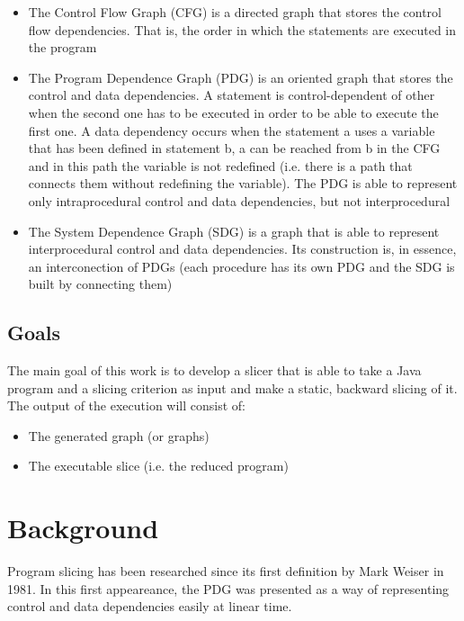 \documentclass[a4paper]{article}
\begin{document}
\begin{itemize}
\item The Control Flow Graph (CFG) is a directed graph that stores the control flow dependencies. That is, the order in which the statements are executed in the program
\item The Program Dependence Graph (PDG) is an oriented graph that stores the control and data dependencies. A statement is control-dependent of other when the second one has to be executed in order to be able to execute the first one. A data dependency occurs when the statement a uses a variable that has been defined in statement b, a can be reached from b in the CFG and in this path the variable is not redefined (i.e. there is a path that connects them without redefining the variable). The PDG is able to represent only intraprocedural control and data dependencies, but not interprocedural
\item The System Dependence Graph (SDG) is a graph that is able to represent interprocedural control and data dependencies. Its construction is, in essence, an interconection of PDGs (each procedure has its own PDG and the SDG is built by connecting them)

\end{itemize}

\subsection{Goals}

The main goal of this work is to develop a slicer that is able to take a Java program and a slicing criterion as input and make a static, backward slicing of it. The output of the execution will consist of:

\begin{itemize}
  \item The generated graph (or graphs)
  \item The executable slice (i.e. the reduced program)
\end{itemize}

\section{Background}

Program slicing has been researched since its first definition by Mark Weiser in 1981. In this first appeareance, the PDG was presented as a way of representing control and data dependencies easily at linear time.
\end{document}
